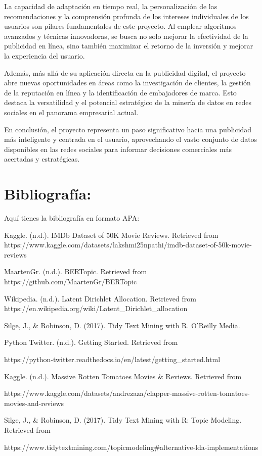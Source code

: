 \documentclass[
  letterpaper,
  DIV=11,
  numbers=noendperiod]{scrartcl}
\begin{document}
La capacidad de adaptación en tiempo real, la personalización de las
recomendaciones y la comprensión profunda de los intereses individuales
de los usuarios son pilares fundamentales de este proyecto. Al emplear
algoritmos avanzados y técnicas innovadoras, se busca no solo mejorar la
efectividad de la publicidad en línea, sino también maximizar el retorno
de la inversión y mejorar la experiencia del usuario.

Además, más allá de su aplicación directa en la publicidad digital, el
proyecto abre nuevas oportunidades en áreas como la investigación de
clientes, la gestión de la reputación en línea y la identificación de
embajadores de marca. Esto destaca la versatilidad y el potencial
estratégico de la minería de datos en redes sociales en el panorama
empresarial actual.

En conclusión, el proyecto representa un paso significativo hacia una
publicidad más inteligente y centrada en el usuario, aprovechando el
vasto conjunto de datos disponibles en las redes sociales para informar
decisiones comerciales más acertadas y estratégicas.

\newpage{}

\section{Bibliografía:}\label{bibliografuxeda}

Aquí tienes la bibliografía en formato APA:

Kaggle. (n.d.). IMDb Dataset of 50K Movie Reviews. Retrieved from
https://www.kaggle.com/datasets/lakshmi25npathi/imdb-dataset-of-50k-movie-reviews

MaartenGr. (n.d.). BERTopic. Retrieved from
https://github.com/MaartenGr/BERTopic

Wikipedia. (n.d.). Latent Dirichlet Allocation. Retrieved from
https://en.wikipedia.org/wiki/Latent\_Dirichlet\_allocation

Silge, J., \& Robinson, D. (2017). Tidy Text Mining with R. O'Reilly
Media.

Python Twitter. (n.d.). Getting Started. Retrieved from

https://python-twitter.readthedocs.io/en/latest/getting\_started.html

Kaggle. (n.d.). Massive Rotten Tomatoes Movies \& Reviews. Retrieved
from

https://www.kaggle.com/datasets/andrezaza/clapper-massive-rotten-tomatoes-movies-and-reviews

Silge, J., \& Robinson, D. (2017). Tidy Text Mining with R: Topic
Modeling. Retrieved from

https://www.tidytextmining.com/topicmodeling\#alternative-lda-implementations
\end{document}
